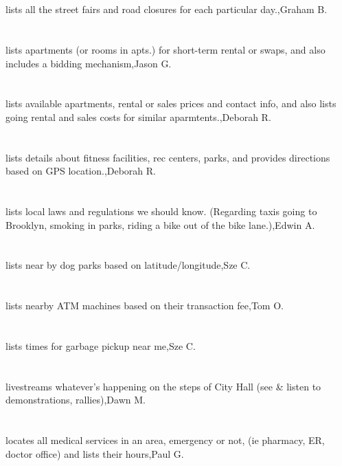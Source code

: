 \section{}lists all the street fairs and road closures for each particular day.,Graham B.	
\section{}lists apartments (or rooms in apts.) for short-term rental or swaps, and also includes a bidding mechanism,Jason G.	
\section{}lists available apartments, rental or sales prices and contact info, and also lists going rental and sales costs for similar aparmtents.,Deborah R.	
\section{}lists details about fitness facilities, rec centers, parks, and provides directions based on GPS location.,Deborah R.	
\section{}lists local laws and regulations we should know. (Regarding taxis going to Brooklyn, smoking in parks, riding a bike out of the bike lane.),Edwin A.	
\section{}lists near by dog parks based on latitude/longitude,Sze C.	
\section{}lists nearby ATM machines based on their transaction fee,Tom O.	
\section{}lists times for garbage pickup near me,Sze C.	
\section{} livestreams whatever's happening on the steps of City Hall (see \& listen to demonstrations, rallies),Dawn M.	
\section{}locates all medical services in an area, emergency or not, (ie pharmacy, ER, doctor office) and lists their hours,Paul G.	
